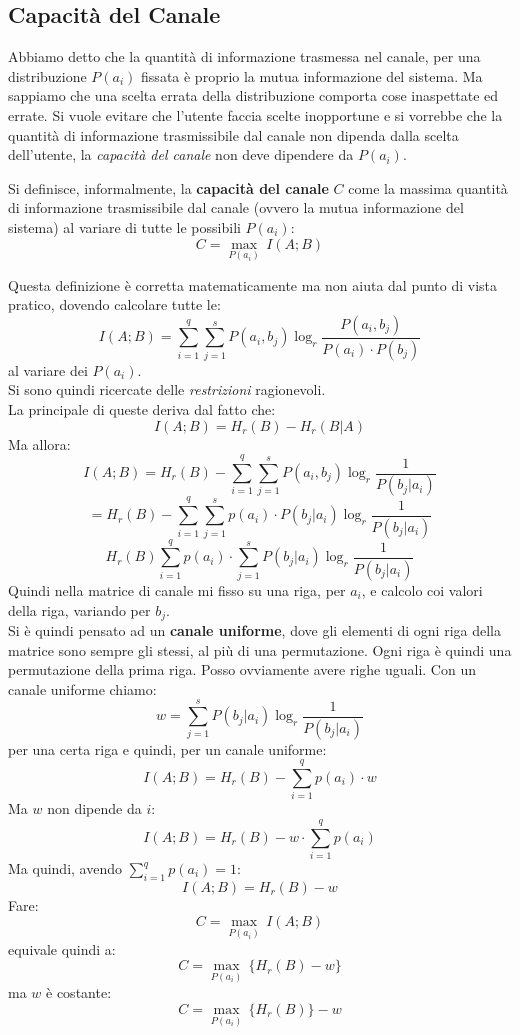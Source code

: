 \documentclass[a4paper,12pt, oneside]{book}
\begin{document}
\subsection{Capacità del Canale}
Abbiamo detto che la quantità di informazione trasmessa nel canale, per una
distribuzione $P(a_i)$ fissata è proprio la mutua informazione del sistema. Ma
sappiamo che una scelta errata della distribuzione comporta cose inaspettate ed
errate. Si vuole evitare che l'utente faccia scelte inopportune e si vorrebbe
che 
la quantità di informazione trasmissibile dal canale non dipenda dalla scelta
dell'utente, la \textit{capacità del canale} non deve dipendere da $P(a_i)$.
\begin{definizione}
  Si definisce, informalmente, la \textbf{capacità del canale} $C$ come la
  massima 
  quantità di informazione trasmissibile dal canale (ovvero la mutua
  informazione del sistema) al variare di tutte le
  possibili $P(a_i)$: 
  \[C=\max_{P(a_i)}\,I(A;B)\]
\end{definizione}
Questa definizione è corretta matematicamente ma non aiuta dal punto di vista
pratico, dovendo calcolare tutte le:
\[I(A;B)=\sum_{i=1}^q\sum_{j=1}^s P(a_i,b_j)\log_r\frac{P(a_i,b_j)}{P(a_i)\cdot
    P(b_j)}\]
al variare dei $P(a_i)$.\\
Si sono quindi ricercate delle \textit{restrizioni} ragionevoli.\\
La principale di queste deriva dal fatto che:
\[I(A;B)=H_r(B)-H_r(B|A)\]
Ma allora:
\[I(A;B)=H_r(B)-\sum_{i=1}^q\sum_{j=1}^s P(a_i,b_j)\log_r\frac{1}{P(b_j|a_i)}\]
\[=H_r(B)-\sum_{i=1}^q\sum_{j=1}^sp(a_i)\cdot
  P(b_j|a_i)\log_r\frac{1}{P(b_j|a_i)}\]
\[H_r(B)\sum_{i=1}^q p(a_i)\cdot\sum_{j=1}^s
  P(b_j|a_i)\log_r\frac{1}{P(b_j|a_i)}\]
Quindi nella matrice di canale mi fisso su una riga, per $a_i$, e calcolo coi
valori della riga, variando per $b_j$.\\
Si è quindi pensato ad un \textbf{canale uniforme}, dove gli elementi di ogni
riga della matrice sono sempre gli stessi, al più di una permutazione. Ogni riga
è quindi una permutazione della prima riga. Posso ovviamente avere righe uguali.
Con un canale uniforme chiamo:
\[w=\sum_{j=1}^sP(b_j|a_i)\log_r\frac{1}{P(b_j|a_i)}\]
per una certa riga e quindi, per un canale uniforme:
\[I(A;B)=H_r(B)-\sum_{i=1}^q p(a_i)\cdot w\]
Ma $w$ non dipende da $i$:
\[I(A;B)=H_r(B)-w\cdot \sum_{i=1}^q p(a_i)\]
Ma quindi, avendo $\sum_{i=1}^q p(a_i)=1$:
\[I(A;B)=H_r(B)-w\]
Fare:
\[C=\max_{P(a_i)}\,I(A;B)\]
equivale quindi a:
\[C=\max_{P(a_i)}\,\{H_r(B)-w\}\]
ma $w$ è costante:
\[C=\max_{P(a_i)}\,\{H_r(B)\}-w\]
\end{document}

